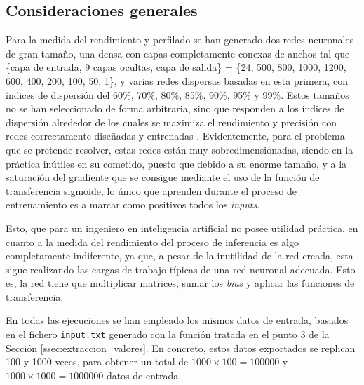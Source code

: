 \subsection{Consideraciones generales}
\label{ssec:consideraciones_generales}
Para la medida del rendimiento y perfilado se han generado dos redes neuronales de gran tamaño, una densa con capas completamente conexas de anchos tal que \{capa de entrada, 9 capas ocultas, capa de salida\} = \{24, 500, 800, 1000, 1200, 600, 400, 200, 100, 50, 1\}, y varias redes dispersas basadas en esta primera, con índices de dispersión del 60\%, 70\%, 80\%, 85\%, 90\%, 95\% y 99\%. Estos tamaños no se han seleccionado de forma arbitraria, sino que responden a los índices de dispersión alrededor de los cuales se maximiza el rendimiento y precisión con redes correctamente diseñadas y entrenadas \cite[Figura 4]{hoefler2102sparsity}. Evidentemente, para el problema que se pretende resolver, estas redes están muy sobredimensionadas, siendo en la práctica inútiles en su cometido, puesto que debido a su enorme tamaño, y a la saturación del gradiente que se consigue mediante el uso de la función de transferencia sigmoide, lo único que aprenden durante el proceso de entrenamiento es a marcar como positivos todos los \textit{inputs}.

Esto, que para un ingeniero en inteligencia artificial no posee utilidad práctica, en cuanto a la medida del rendimiento del proceso de inferencia es algo completamente indiferente, ya que, a pesar de la inutilidad de la red creada, esta sigue realizando las cargas de trabajo típicas de una red neuronal adecuada. Esto es, la red tiene que multiplicar matrices, sumar los \textit{bias} y aplicar las funciones de transferencia.

En todas las ejecuciones se han empleado los mismos datos de entrada, basados en el fichero \texttt{input.txt} generado con la función tratada en el punto 3 de la Sección \ref{ssec:extraccion_valores}. En concreto, estos datos exportados se replican 100 y 1000 veces, para obtener un total de $1000 \times 100 = 100000$ y $1000 \times 1000 = 1000000$ datos de entrada.


